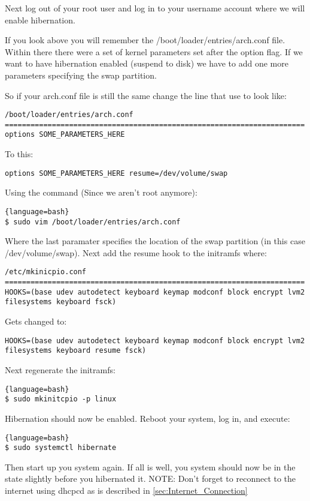 Next log out of your root user and log in to your username account where we will enable hibernation.

If you look above you will remember the /boot/loader/entries/arch.conf file. Within there there were a set of kernel parameters set after the option flag. If we want to have hibernation enabled (suspend to disk) we have to add one more parameters specifying the swap partition.

So if your arch.conf file is still the same change the line that use to look like:
\begin{verbatim}
/boot/loader/entries/arch.conf
======================================================================
options SOME_PARAMETERS_HERE
\end{verbatim}
To this:
\begin{verbatim}
options SOME_PARAMETERS_HERE resume=/dev/volume/swap
\end{verbatim}
Using the command (Since we aren't root anymore):
\begin{lstlisting}{language=bash}
$ sudo vim /boot/loader/entries/arch.conf
\end{lstlisting}
Where the last paramater specifies the location of the swap partition (in this case /dev/volume/swap).
Next add the resume hook to the initramfs where:
\begin{verbatim}
/etc/mkinicpio.conf
======================================================================
HOOKS=(base udev autodetect keyboard keymap modconf block encrypt lvm2 filesystems keyboard fsck)
\end{verbatim}
Gets changed to:
\begin{verbatim}
HOOKS=(base udev autodetect keyboard keymap modconf block encrypt lvm2 filesystems keyboard resume fsck)
\end{verbatim}
Next regenerate the initramfs:
\begin{lstlisting}{language=bash}
$ sudo mkinitcpio -p linux
\end{lstlisting}

Hibernation should now be enabled. Reboot your system, log in, and execute:
\begin{lstlisting}{language=bash}
$ sudo systemctl hibernate
\end{lstlisting}
Then start up you system again. If all is well, you system should now be in the state slightly before you hibernated it.
NOTE: Don't forget to reconnect to the internet using dhcpcd as is described in \ref{sec:Internet_Connection}

